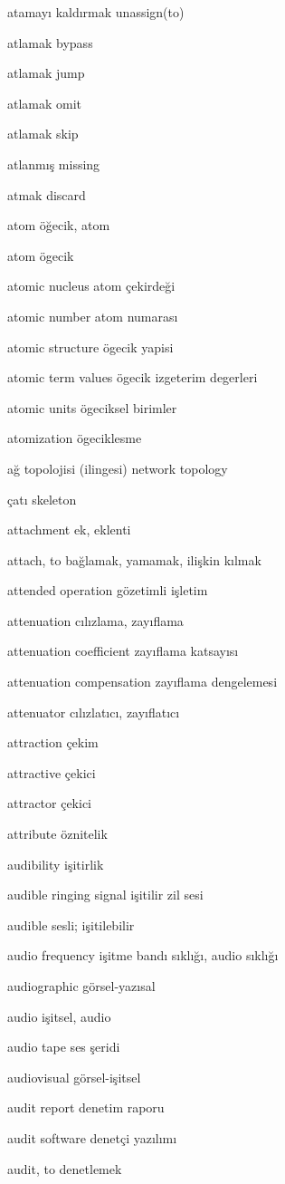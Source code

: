 \documentclass[12pt,fleqn]{article}\usepackage{../../common}
\begin{document}
atamayı kaldırmak unassign(to)

atlamak bypass

atlamak jump

atlamak omit

atlamak skip

atlanmış missing

atmak discard

atom öğecik, atom

atom ögecik

atomic nucleus atom çekirdeği

atomic number atom numarası

atomic structure ögecik yapisi

atomic term values ögecik izgeterim degerleri

atomic units ögeciksel birimler

atomization ögeciklesme

ağ topolojisi (ilingesi) network topology

çatı skeleton

attachment ek, eklenti

attach, to bağlamak, yamamak, ilişkin kılmak

attended operation gözetimli işletim

attenuation cılızlama, zayıflama

attenuation coefficient zayıflama katsayısı

attenuation compensation zayıflama dengelemesi

attenuator cılızlatıcı, zayıflatıcı

attraction çekim

attractive çekici

attractor çekici

attribute öznitelik

audibility işitirlik

audible ringing signal işitilir zil sesi

audible sesli; işitilebilir

audio frequency işitme bandı sıklığı, audio sıklığı

audiographic görsel-yazısal

audio işitsel, audio

audio tape ses şeridi

audiovisual görsel-işitsel

audit report denetim raporu

audit software denetçi yazılımı

audit, to denetlemek
\end{document}
